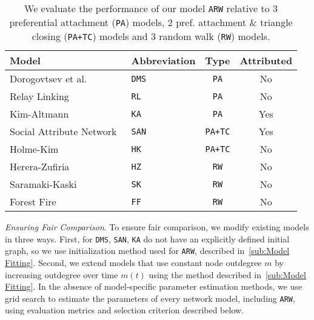 %
%

\begin{table}[t]
 \center
 {
  \begin{tabular}[c]{llcc} \toprule
  Model &  Abbreviation & Type & Attributed \\ \midrule
  Dorogovtsev et al.~\cite{dorogovtsev2000structure} & \texttt{DMS} & \texttt{PA} & No  \\
  Relay Linking~\cite{singh2017relay} 						  & \texttt{RL} & \texttt{PA} & No  \\
  Kim-Altmann~\cite{kim2017effect} 							  & \texttt{KA} & \texttt{PA} & Yes  \\ \midrule
  Social Attribute Network~\cite{gong2012evolution} 	  & \texttt{SAN} & \texttt{PA+TC} & Yes  \\
  Holme-Kim~\cite{holme2002growing} 						  & \texttt{HK} & \texttt{PA+TC} & No  \\ \midrule
  Herera-Zufiria~\cite{herrera2011generating} 				  & \texttt{HZ} & \texttt{RW} & No  \\
  Saramaki-Kaski~\cite{saramaki2004scale} 					  & \texttt{SK} & \texttt{RW} & No  \\
  Forest Fire~\cite{leskovec2005graphs} 					  & \texttt{FF} & \texttt{RW} & No  \\
   \bottomrule
  \end{tabular}
  \vspace{1mm}
  \caption{
  	  We evaluate the performance of our model \texttt{ARW} relative to 3 preferential attachment
	  (\texttt{PA}) models, 2 pref. attachment \& triangle closing (\texttt{PA+TC}) models and 3 random walk (\texttt{RW}) models.
  }
  \label{table:models}
 }
 \vspace{-10pt}
\end{table}

\textit{Ensuring Fair Comparison}. To ensure fair comparison, we modify existing models in three ways.
First, for \texttt{DMS}, \texttt{SAN}, \texttt{KA} do not have an explicitly defined initial graph,
so we use initialization method used for \texttt{ARW}, described in~\cref{sub:Model Fitting}. Second, we extend
models that use constant node outdegree $m$ by increasing outdegree over time $m(t)$
using the method described in~\cref{sub:Model Fitting}. In the absence of model-specific parameter estimation methods,
we use grid search to estimate the parameters of every network model, including \texttt{ARW},
using evaluation metrics and selection criterion described below.

